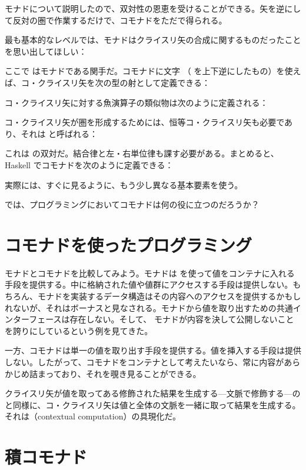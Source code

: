 
\lettrine[lhang=0.17]{モ}{ナドについて説明したので}、双対性の恩恵を受けることができる。矢を逆にして反対の圏で作業するだけで、コモナドをただで得られる。

最も基本的なレベルでは、モナドはクライスリ矢の合成に関するものだったことを思い出してほしい：

ここで  はモナドである関手だ。コモナドに文字 （ を上下逆にしたもの）を使えば、コ・クライスリ矢を次の型の射として定義できる：

コ・クライスリ矢に対する魚演算子の類似物は次のように定義される：

コ・クライスリ矢が圏を形成するためには、恒等コ・クライスリ矢も必要であり、それは  と呼ばれる：

これは  の双対だ。結合律と左・右単位律も課す必要がある。まとめると、Haskell でコモナドを次のように定義できる：

実際には、すぐに見るように、もう少し異なる基本要素を使う。

では、プログラミングにおいてコモナドは何の役に立つのだろうか？

\section{コモナドを使ったプログラミング}

モナドとコモナドを比較してみよう。モナドは  を使って値をコンテナに入れる手段を提供する。中に格納された値や値群にアクセスする手段は提供しない。もちろん、モナドを実装するデータ構造はその内容へのアクセスを提供するかもしれないが、それはボーナスと見なされる。モナドから値を取り出すための共通インターフェースは存在しない。そして、 モナドが内容を決して公開しないことを誇りにしているという例を見てきた。

一方、コモナドは単一の値を取り出す手段を提供する。値を挿入する手段は提供しない。したがって、コモナドをコンテナとして考えたいなら、常に内容があらかじめ詰まっており、それを覗き見ることができる。

クライスリ矢が値を取ってある修飾された結果を生成する---文脈で修飾する---のと同様に、コ・クライスリ矢は値と全体の文脈を一緒に取って結果を生成する。それは（contextual computation）の具現化だ。

\section{積コモナド}

